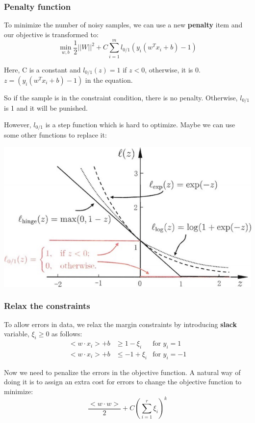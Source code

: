 \documentclass[letterpaper,12pt]{article}
\begin{document}
\subsubsection{Penalty function}
To minimize the number of noisy samples, we can use a new \textbf{penalty} item and our objective is transformed to:
\[
    \min_{w,b}\frac{1}{2}||W||^2+C\sum_{i=1}^{m}l_{0/1}(y_i(w^T x_i+b)-1)
\]

Here, C is a constant and $l_{0/1}(z)=1$ if $z<0$, otherwise, it is 0. $z =
    (y_i(w^T x_i+b)-1) $ in the equation.

So if the sample is in the constraint condition, there is no penalty.
Otherwise, $l_{0/1}$ is 1 and it will be punished.

However, $l_{0/1}$ is a step function which is hard to optimize. Maybe we can
use some other functions to replace it:

\includegraphics*{./Image/Soft-Margin SVM penalty function.png}

\subsubsection{Relax the constraints}
To allow errors in data, we relax the margin constraints by introducing \textbf{slack} variable, $\xi_i \ge 0$ as follows:
\begin{align*}
    <w\cdot x_i>+b & \ge 1 - \xi_i  & \text{for }y_i=1  \\
    <w\cdot x_i>+b & \le -1 + \xi_i & \text{for }y_i=-1
\end{align*} 

Now we need to penalize the errors in the objective function. A natural way of doing it is to assign an extra cost for errors to change the objective function to minimize:
\[
\frac{<w\cdot w>}{2} + C(\sum_{i=1}^{r}\xi_i)^k    
\]
\end{document}
